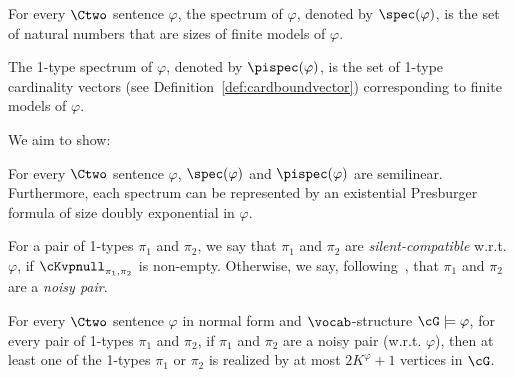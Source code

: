\begin{definition}
    For every $\Ctwo$ sentence $\varphi$,
    the spectrum of $\varphi$, denoted by $\spec(\varphi)$,
    is the set of natural numbers that are sizes of finite models of $\varphi$.

    The 1-type spectrum of $\varphi$, denoted by $\pispec(\varphi)$,
    is the set of 1-type cardinality vectors (see Definition~\ref{def:cardboundvector}) corresponding to finite models of $\varphi$.
\end{definition}

We aim to show: 

\begin{theorem} \label{thm:spectrasemilinear}
    For every $\Ctwo$ sentence $\varphi$,
    $\spec(\varphi)$ and $\pispec(\varphi)$ are semilinear.
    Furthermore, each spectrum can be represented by an existential Presburger formula of size doubly exponential in $\varphi$.
\end{theorem}

\begin{definition}
    For a pair of 1-types $\pi_1$ and $\pi_2$,
    we say that $\pi_1$ and $\pi_2$ are \emph{silent-compatible} w.r.t. $\varphi$,
    if $\cKvpnull_{\pi_1, \pi_2}$ is non-empty. Otherwise, we say, following~\cite{ctwocomplexity}, that 
    $\pi_1$ and $\pi_2$ are a \emph{noisy pair}.
\end{definition}

\begin{lemma} \label{lem:differentiated}
    For every $\Ctwo$ sentence $\varphi$ in normal form and $\vocab$-structure $\cG \models \varphi$,
    for every pair of 1-types $\pi_1$ and $\pi_2$,
    if $\pi_1$ and $\pi_2$ are a noisy pair (w.r.t. $\varphi$), then
    at least one of the 1-types $\pi_1$ or $\pi_2$ is realized by at most $2K^\varphi+1$ vertices in $\cG$.
\end{lemma}

